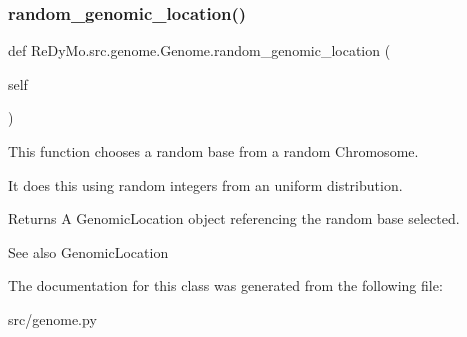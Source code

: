 \subsubsection{\texorpdfstring{random\+\_\+genomic\+\_\+location()}{random\_genomic\_location()}}
{\footnotesize\ttfamily def Re\+Dy\+Mo.\+src.\+genome.\+Genome.\+random\+\_\+genomic\+\_\+location (\begin{DoxyParamCaption}\item[{}]{self }\end{DoxyParamCaption})}



This function chooses a random base from a random Chromosome. 

It does this using random integers from an uniform distribution. \begin{DoxyReturn}{Returns}
A Genomic\+Location object referencing the random base selected. 
\end{DoxyReturn}
\begin{DoxySeeAlso}{See also}
Genomic\+Location 
\end{DoxySeeAlso}


The documentation for this class was generated from the following file\+:\begin{DoxyCompactItemize}
\item 
src/genome.\+py\end{DoxyCompactItemize}
